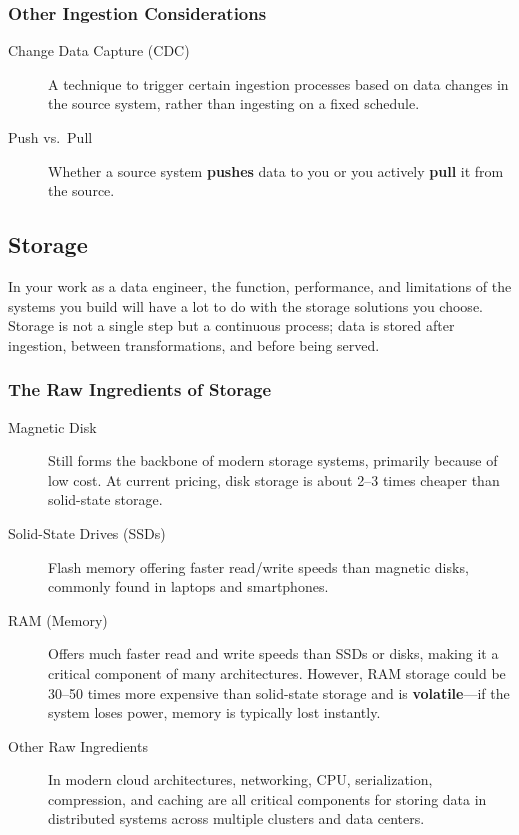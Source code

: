 \documentclass{article}
\begin{document}
\subsubsection{Other Ingestion Considerations}
\begin{description}
    \item[Change Data Capture (CDC)] A technique to trigger certain ingestion processes based on data changes in the source system, rather than ingesting on a fixed schedule.
    \item[Push vs.\ Pull] Whether a source system \textbf{pushes} data to you or you actively \textbf{pull} it from the source.
\end{description}

\subsection{Storage}
In your work as a data engineer, the function, performance, and limitations of the systems you build will have a lot to do with the storage solutions you choose. Storage is not a single step but a continuous process; data is stored after ingestion, between transformations, and before being served.

\subsubsection{The Raw Ingredients of Storage}
\begin{description}
    \item[Magnetic Disk] Still forms the backbone of modern storage systems, primarily because of low cost. At current pricing, disk storage is about 2--3 times cheaper than solid-state storage.

    \item[Solid-State Drives (SSDs)] Flash memory offering faster read/write speeds than magnetic disks, commonly found in laptops and smartphones.

    \item[RAM (Memory)] Offers much faster read and write speeds than SSDs or disks, making it a critical component of many architectures. However, RAM storage could be 30--50 times more expensive than solid-state storage and is \textbf{volatile}---if the system loses power, memory is typically lost instantly.

    \item[Other Raw Ingredients] In modern cloud architectures, networking, CPU, serialization, compression, and caching are all critical components for storing data in distributed systems across multiple clusters and data centers.
\end{description}
\end{document}
